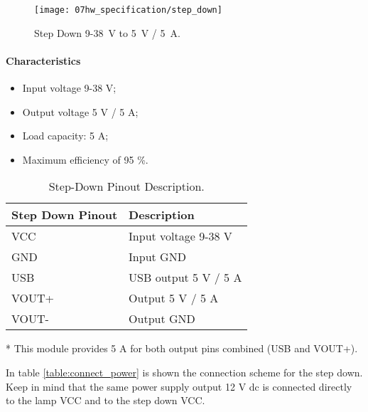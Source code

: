 \begin{figure}[H]
	\centering
	\texttt{[image: 07hw\_specification/step\_down]}
	\caption{Step Down 9-38~V to 5~V / 5~A.}
	\label{fig:step_down}
\end{figure}

\paragraph*{Characteristics}
\begin{itemize}
	\item Input voltage 9-38 V;
	\item Output voltage 5 V / 5 A;
	\item Load capacity: 5 A;
	\item Maximum efficiency of 95 \%.
\end{itemize}

\begin{table}[H]
	\centering
	\begin{threeparttable}
	\begin{tabular}{|m{5cm}|m{6cm}|}
		\hline
		\textbf{Step Down Pinout} & \textbf{Description}
		\\\hline\hline
		
		VCC & Input voltage 9-38 V
		\\\hline
		GND & Input GND
		\\\hline
		USB & USB output 5 V / 5 A \tnote{*}
		\\\hline
		VOUT+ & Output 5 V / 5 A \tnote{*}
		\\\hline
		VOUT- & Output GND
		\\\hline
	\end{tabular}
	
	\begin{tablenotes}
		\small
		\item[*] This module provides 5 A for both output pins combined (USB and VOUT+).
	\end{tablenotes}
	\end{threeparttable}
	\caption{Step-Down Pinout Description.}
	\label{table:step_down_pinout}
\end{table}


In table \ref{table:connect_power} is shown the connection scheme for the step down. Keep in mind that the same power supply output 12 V \ac{dc} is connected directly to the lamp VCC and to the step down VCC.

